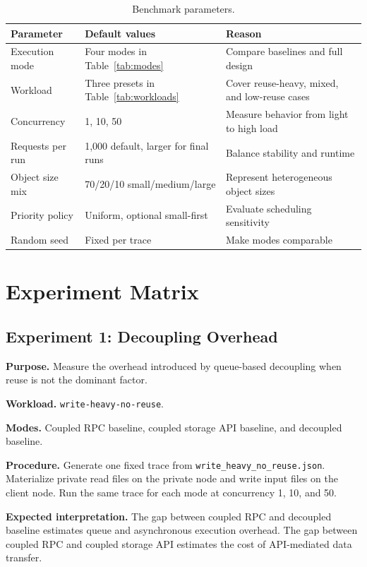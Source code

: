 \documentclass[11pt]{article}
\begin{document}
\begin{table}[h]
\centering
\caption{Benchmark parameters.}
\label{tab:params}
\begin{tabular}{lll}
\toprule
\textbf{Parameter} & \textbf{Default values} & \textbf{Reason} \\
\midrule
Execution mode &
Four modes in Table~\ref{tab:modes} &
Compare baselines and full design \\
Workload &
Three presets in Table~\ref{tab:workloads} &
Cover reuse-heavy, mixed, and low-reuse cases \\
Concurrency &
1, 10, 50 &
Measure behavior from light to high load \\
Requests per run &
1,000 default, larger for final runs &
Balance stability and runtime \\
Object size mix &
70/20/10 small/medium/large &
Represent heterogeneous object sizes \\
Priority policy &
Uniform, optional small-first &
Evaluate scheduling sensitivity \\
Random seed &
Fixed per trace &
Make modes comparable \\
\bottomrule
\end{tabular}
\end{table}

\section{Experiment Matrix}

\subsection{Experiment 1: Decoupling Overhead}

\textbf{Purpose.}
Measure the overhead introduced by queue-based decoupling when reuse is not the
dominant factor.

\textbf{Workload.}
\texttt{write-heavy-no-reuse}.

\textbf{Modes.}
Coupled RPC baseline, coupled storage API baseline, and decoupled baseline.

\textbf{Procedure.}
Generate one fixed trace from \texttt{write\_heavy\_no\_reuse.json}.  Materialize
private read files on the private node and write input files on the client node.
Run the same trace for each mode at concurrency 1, 10, and 50.

\textbf{Expected interpretation.}
The gap between coupled RPC and decoupled baseline estimates queue and
asynchronous execution overhead.  The gap between coupled RPC and coupled
storage API estimates the cost of API-mediated data transfer.
\end{document}
